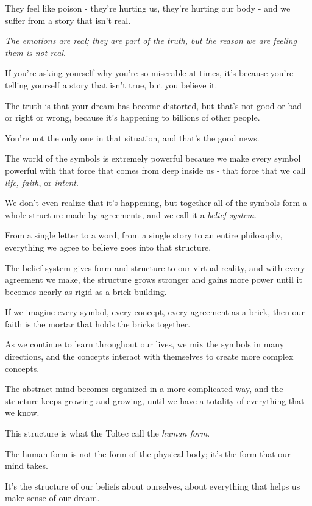 \documentclass{article}
\numberwithin{equation}{section}
\begin{document}
They feel like poison - they're hurting us, they're hurting our body - and we suffer from a story that isn't real.

\textit{The emotions are real; they are part of the truth, but the reason we are feeling them is not real}.


%
If you're asking yourself why you're so miserable at times, it's because you're telling yourself a story that isn't true, but you believe it.

The truth is that your dream has become distorted, but that's not good or bad or right or wrong, because it's happening to billions of other people.

You're not the only one in that situation, and that's the good news.

%
The world of the symbols is extremely powerful because we make every symbol powerful with that force that comes from deep inside us - that force that we call \textit{life, faith}, or \textit{intent}.

We don't even realize that it's happening, but together all of the symbols form a whole structure made by agreements, and we call it a \textit{belief system}.

From a single letter to a word, from a single story to an entire philosophy, everything we agree to believe goes into that structure.

%
The belief system gives form and structure to our virtual reality, and with every agreement we make, the structure grows stronger and gains more power until it becomes nearly as rigid as a brick building.

If we imagine every symbol, every concept, every agreement as a brick, then our faith is the mortar that holds the bricks together.

As we continue to learn throughout our lives, we mix the symbols in many directions, and the concepts interact with themselves to create more complex concepts.

The abstract mind becomes organized in a more complicated way, and the structure keeps growing and growing, until we have a totality of everything that we know.

This structure is what the Toltec call the \textit{human form}.

The human form is not the form of the physical body; it's the form that our mind takes.

It's the structure of our beliefs about ourselves, about everything that helps us make sense of our dream.
\end{document}
